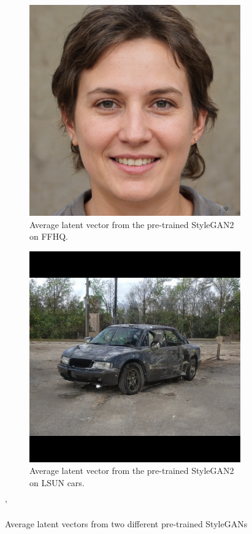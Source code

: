 \begin{figure}
  \centering
  \begin{subfigure}[b]{0.45\textwidth}
      \centering
      \includegraphics[width=\textwidth]{images/magec/face_average.png}
      \caption{Average latent vector from the pre-trained StyleGAN2 on FFHQ.}
      \label{fig:avg_ffhq}
  \end{subfigure}
  \hfill
  \begin{subfigure}[b]{0.45\textwidth}
      \centering
      \includegraphics[width=\textwidth]{images/magec/car_average.png}
      \caption{Average latent vector from the pre-trained StyleGAN2 on LSUN cars.}
      \label{fig:avg_cars}
  \end{subfigure}
  \caption{Average latent vectors from two different pre-trained StyleGANs}
  \label{fig:stylegan_averages}'
\end{figure}
